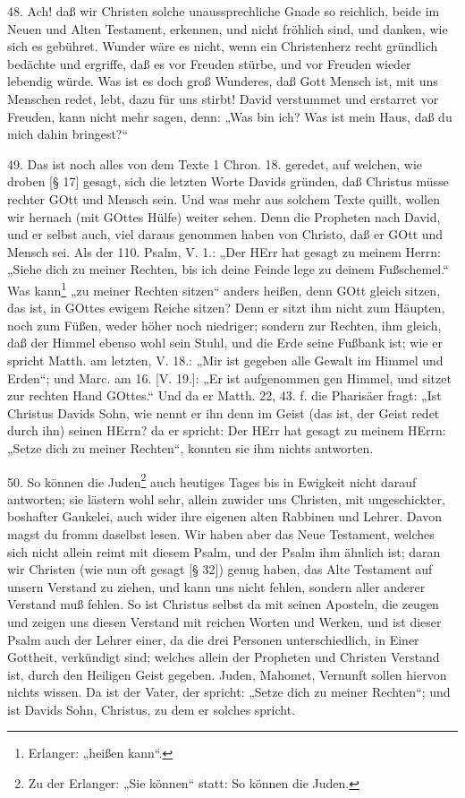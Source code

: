 48. Ach! daß wir Christen solche unaussprechliche Gnade so reichlich, beide im Neuen und Alten Testament, erkennen, und nicht fröhlich sind, und danken, wie sich es gebühret. Wunder wäre es nicht, wenn ein Christenherz recht gründlich bedächte und ergriffe, daß es vor Freuden stürbe, und vor Freuden wieder lebendig würde. Was ist es doch groß Wunderes, daß Gott Mensch ist, mit uns Menschen redet, lebt, dazu für uns stirbt! David verstummet und erstarret vor Freuden, kann nicht mehr sagen, denn: „Was bin ich? Was ist mein Haus, daß du mich dahin bringest?“

49. Das ist noch alles von dem Texte 1 Chron. 18. geredet, auf welchen, wie droben [§ 17] gesagt, sich die letzten Worte Davids gründen, daß Christus müsse rechter GOtt und Mensch sein. Und was mehr aus solchem Texte quillt, wollen wir hernach (mit GOttes Hülfe) weiter sehen. Denn die Propheten nach David, und er selbst auch, viel daraus genommen haben von Christo, daß er GOtt und Mensch sei. Als der 110. Psalm, V. 1.: „Der HErr hat gesagt zu meinem Herrn: „Siehe dich zu meiner Rechten, bis ich deine Feinde lege zu deinem Fußschemel.“ Was kann\footnote{Erlanger: „heißen kann“.} „zu meiner Rechten sitzen“ anders heißen, denn GOtt gleich sitzen, das ist, in GOttes ewigem Reiche sitzen? Denn er sitzt ihm nicht zum Häupten, noch zum Füßen, weder höher noch niedriger; sondern zur Rechten, ihm gleich, daß der Himmel ebenso wohl sein Stuhl, und die Erde seine Fußbank ist; wie er spricht Matth. am letzten, V. 18.: „Mir ist gegeben alle Gewalt im Himmel und Erden“; und Marc. am 16. [V. 19.]: „Er ist aufgenommen gen Himmel, und sitzet zur rechten Hand GOttes.“ Und da er Matth. 22, 43. f. die Pharisäer fragt: „Ist Christus Davids Sohn, wie nennt er ihn denn im Geist (das ist, der Geist redet durch ihn) seinen HErrn? da er spricht: Der HErr hat gesagt zu meinem HErrn: „Setze dich zu meiner Rechten“, konnten sie ihm nichts antworten.

50. So können die Juden\footnote{Zu der Erlanger: „Sie können“ statt: So können die Juden.} auch heutiges Tages bis in Ewigkeit nicht darauf antworten; sie lästern wohl sehr, allein zuwider uns Christen, mit ungeschickter, boshafter Gaukelei, auch wider ihre eigenen alten Rabbinen und Lehrer. Davon magst du fromm daselbst lesen. Wir haben aber das Neue Testament, welches sich nicht allein reimt mit diesem Psalm, und der Psalm ihm ähnlich ist; daran wir Christen (wie nun oft gesagt [§ 32]) genug haben, das Alte Testament auf unsern Verstand zu ziehen, und kann uns nicht fehlen, sondern aller anderer Verstand muß fehlen. So ist Christus selbst da mit seinen Aposteln, die zeugen und zeigen uns diesen Verstand mit reichen Worten und Werken, und ist dieser Psalm auch der Lehrer einer, da die drei Personen unterschiedlich, in Einer Gottheit, verkündigt sind; welches allein der Propheten und Christen Verstand ist, durch den Heiligen Geist gegeben. Juden, Mahomet, Vernunft sollen hiervon nichts wissen. Da ist der Vater, der spricht: „Setze dich zu meiner Rechten“; und ist Davids Sohn, Christus, zu dem er solches spricht.

